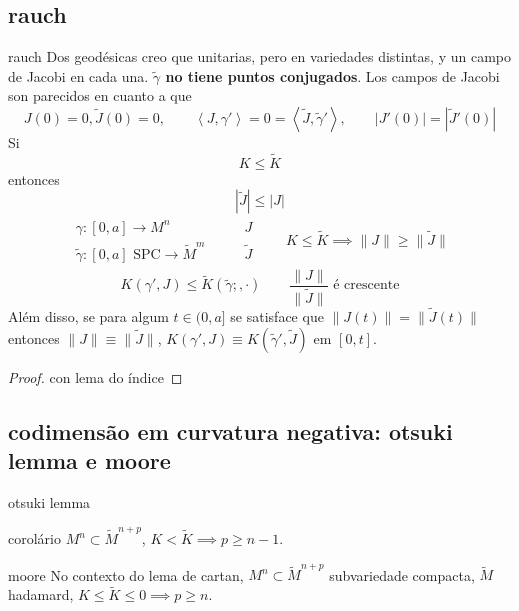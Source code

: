 \subsection{rauch}

\begin{thing6}{rauch}\leavevmode
	Dos geodésicas creo que unitarias, pero en variedades distintas, y un campo de Jacobi en cada una. \textbf{\(\tilde{\gamma}\) no tiene puntos conjugados}. Los campos de Jacobi son parecidos en cuanto a que
	\[J(0)=0, \tilde{J}(0)=0, \qquad \left<J,\gamma'\right>=0=\left<\tilde{J},\tilde{\gamma}'\right>,\qquad |J'(0)|=|\tilde{J}'(0)|\]
Si
\[K\leq \tilde{K}\]
entonces
\[|\tilde{J}|\leq |J|\]
 \begin{align*}
\begin{aligned}
	\gamma:[0,a] \longrightarrow M^n \qquad &J\\
	\tilde{\gamma}:[0,a] \text{ SPC} \longrightarrow \tilde{M}^m \qquad &\tilde{J}
\end{aligned}\qquad K \leq \tilde{K} \implies \|J\| \geq \|\tilde{J}\|
\end{align*}
\[K(\gamma',J) \leq \tilde{K}(\tilde{\gamma};,\cdot)\qquad \frac{\|J\|}{\|\tilde{J}\|}\text{ é crescente} \]
Além disso, se para algum \(t \in (0,a]\) se satisface que \(\|J(t)\|=\|\tilde{J}(t)\|\) entonces \(\|J\|\equiv\|\tilde{J}\|\), \(K(\gamma',J)\equiv K(\tilde{\gamma}',\tilde{J})\) em \([0,t]\).
\end{thing6}
\begin{proof}\leavevmode
con lema do índice
\end{proof}

\subsection{codimensão em curvatura negativa: otsuki lemma e moore}

\begin{thing6}{otsuki lemma}\leavevmode
\end{thing6}

\begin{thing6}{corolário}\leavevmode
\(M^n \subset \tilde{M}^{n+p}\), \(K < \tilde{K} \implies p \geq n-1\).
\end{thing6}

\begin{thing6}{moore}\leavevmode
No contexto do lema de cartan, \(M^n \subset \tilde{M}^{n+p}\) subvariedade compacta, \(\tilde{M}\) hadamard, \(K \leq  \tilde{K} \leq 0 \implies p \geq n\).
\end{thing6}

